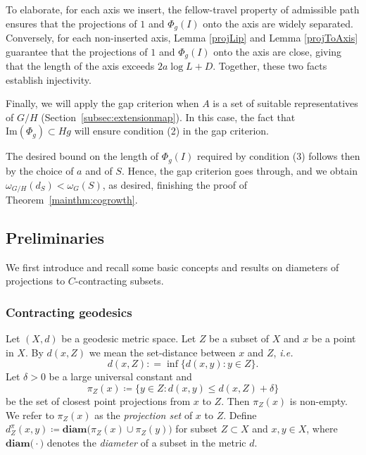 \documentclass{amsart}
\numberwithin{thm}{section}
\numberwithin{figure}{section}
\theoremstyle{definition}
\theoremstyle{definition}
\theoremstyle{remark}
\newcommand{\U}{X}
\newcommand{\diam }[1]{{\textbf{diam}\big(#1\big)}}
\numberwithin{equation}{section}
\theoremstyle{plain}
\begin{document}
    To elaborate, for each axis we insert, the fellow-travel property of admissible path ensures that the projections of $1$ and $\Phi_g(I)$ onto the axis are widely separated. Conversely, for each non-inserted axis, Lemma \ref{projLip} and Lemma \ref{projToAxis} guarantee that the projections of $1$ and $\Phi_g(I)$ onto the axis are close, giving that the length of the axis exceeds $2a\log L + D$. Together, these two facts establish injectivity.
    

 Finally, we will apply the gap criterion when $A$ is a set of suitable representatives of $G/H$ (Section~\ref{subsec:extensionmap}). In this case, the fact that $\mathrm{Im}(\Phi_g) \subset Hg$ will ensure condition (2) in the gap criterion.

    The desired bound on the length of $\Phi_g(I)$ required by condition (3) follows then by the choice of $a$ and of $S$. Hence, the gap criterion goes through, and we obtain $\omega_{G/H}(d_S) < \omega_G(S)$, as desired, finishing the proof of Theorem~\ref{mainthm:cogrowth}.

\subsection{Preliminaries}\label{SecPrelim}

We first introduce and recall some basic concepts and results on diameters of projections to $C$-contracting subsets.

\subsubsection{Contracting geodesics} 
Let $(\U, d)$ be a geodesic metric space. Let $Z$ be a subset of $\U$ and $x$ be a point in $\U$.  By $d(x, Z)$ we mean the set-distance 
between $x$ and $Z$, \emph{i.e.} 
\[
d(x, Z) : = \inf \big \{ d(x, y): y \in Z \big \}. 
\]
Let $\delta>0$ be a large universal constant and 
\[ \pi_{Z}(x) \coloneqq \big \{ y\in Z: d(x, y) \le d(x, Z)+\delta \big \} \]
be the set of closest point projections from $x$ to $Z$. 
Then $\pi_{Z}(x)$ is non-empty. We refer to $\pi_{Z}(x) $ as the \emph{projection set} of $x$ to $Z$. Define $d_Z^{\pi}(x,y) \coloneqq \diam{\pi_Z(x) \cup \pi_Z(y)}$ for subset $Z\subset X$ and $x, y\in X$, where $\diam \cdot$ denotes the \emph{diameter} of a subset in the metric $d$.
 
\end{document}

